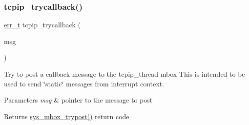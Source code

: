 \subsubsection{\texorpdfstring{tcpip\+\_\+trycallback()}{tcpip\_trycallback()}}
{\footnotesize\ttfamily \hyperlink{group__infrastructure__errors_gaf02d9da80fd66b4f986d2c53d7231ddb}{err\+\_\+t} tcpip\+\_\+trycallback (\begin{DoxyParamCaption}\item[{struct tcpip\+\_\+callback\+\_\+msg $\ast$}]{msg }\end{DoxyParamCaption})}

Try to post a callback-\/message to the tcpip\+\_\+thread mbox This is intended to be used to send \char`\"{}static\char`\"{} messages from interrupt context.


\begin{DoxyParams}{Parameters}
{\em msg} & pointer to the message to post \\
\hline
\end{DoxyParams}
\begin{DoxyReturn}{Returns}
\hyperlink{group__sys__mbox_gaa36345e48a49d67cbb0878cd4cbd2195}{sys\+\_\+mbox\+\_\+trypost()} return code 
\end{DoxyReturn}

